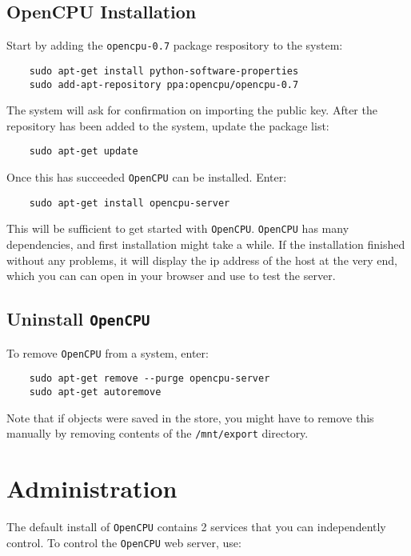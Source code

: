 \documentclass{scrartcl}
\begin{document}
\subsection{OpenCPU Installation}

Start by adding the \texttt{opencpu-0.7} package respository to the system:

\begin{verbatim}
    sudo apt-get install python-software-properties
    sudo add-apt-repository ppa:opencpu/opencpu-0.7
\end{verbatim}
The system will ask for confirmation on importing the public key. After the
repository has been added to the system, update the package list:

\begin{verbatim}
    sudo apt-get update
\end{verbatim}
Once this has succeeded \texttt{OpenCPU} can be installed. Enter:

\begin{verbatim}
    sudo apt-get install opencpu-server
\end{verbatim}
This will be sufficient to get started with \texttt{OpenCPU}. \texttt{OpenCPU} has many
dependencies, and first installation might take a while. If the installation
finished without any problems, it will display the ip address of the host at
the very end, which you can can open in your browser and use to test the
server.

\subsection{Uninstall \texttt{OpenCPU}}

To remove \texttt{OpenCPU} from a system, enter:

\begin{verbatim}
    sudo apt-get remove --purge opencpu-server
    sudo apt-get autoremove
\end{verbatim}

Note that if objects were saved in the store, you might have to remove this
manually by removing contents of the \texttt{/mnt/export} directory.

\section{Administration}

The default install of \texttt{OpenCPU} contains 2 services that you can independently
control. To control the \texttt{OpenCPU} web server, use:
\end{document}
